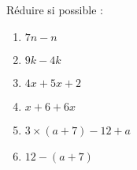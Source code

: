 
\begin{exercice}\label{exosmath-0984}

    Réduire si possible :
    \begin{multicols}{2}
        \begin{enumerate}
            \item
                \( 7n-n\)
            \item
                \( 9k-4k\)
            \item
                \( 4x+5x+2\)
            \item
                \( x+6+6x\)
            \item
                \( 3\times (a+7)-12+a\)
            \item
                \( 12-(a+7)\)
        \end{enumerate}
    \end{multicols}

\end{exercice}
